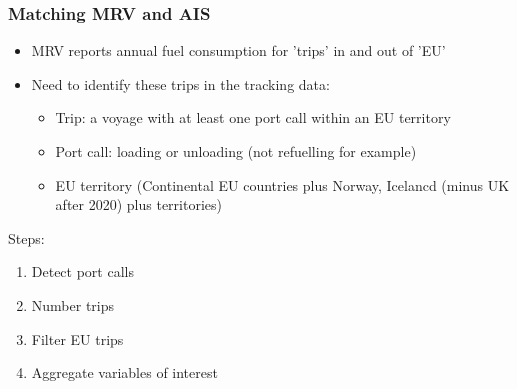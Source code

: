 \documentclass{beamer}
\begin{document}
\begin{frame}
\frametitle{Matching MRV and AIS}

\begin{itemize}
    \item MRV reports annual fuel consumption for 'trips' in and out of 'EU'
    \item Need to identify these trips in the tracking data:
    \begin{itemize}
        \item Trip: a voyage with at least one port call within an EU territory
        \item Port call: loading or unloading (not refuelling for example)
        \item EU territory (Continental EU countries plus Norway, Icelancd (minus UK after 2020) plus territories)
    \end{itemize}
\end{itemize}

\vfill

Steps:
\begin{enumerate}
    \item Detect port calls
    \item Number trips
    \item Filter EU trips
    \item Aggregate variables of interest
\end{enumerate}

\end{frame}

\end{document}
